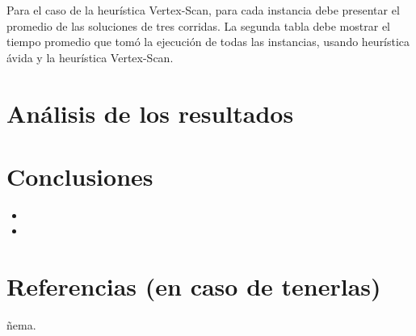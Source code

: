 \documentclass[11pt]{article}
\begin{document}
Para el caso de la heurística Vertex-Scan, para cada instancia debe presentar el promedio
de las soluciones de tres corridas.
La segunda tabla debe mostrar el tiempo promedio que tomó la ejecución de todas las
instancias, usando heurística ávida y la heurística Vertex-Scan.
\section{Análisis de los resultados}


\section{Conclusiones}

\begin{itemize}
   \item 
   \item 
\end{itemize}

\section{Referencias (en caso de tenerlas)}

ñema. \\
\end{document}
